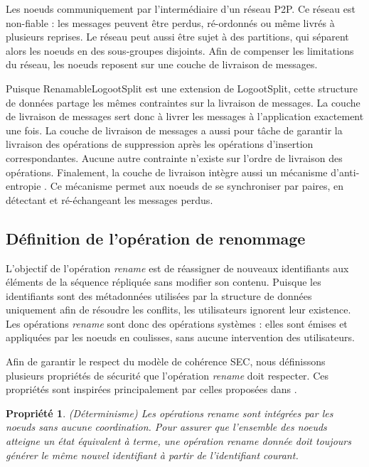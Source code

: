 \documentclass[12pt]{thesul}
\newtheorem{property}{Propriété}
\begin{document}
Les noeuds communiquement par l'intermédiaire d'un réseau \ac{P2P}.
Ce réseau est non-fiable : les messages peuvent être perdus, ré-ordonnés ou même livrés à plusieurs reprises.
Le réseau peut aussi être sujet à des partitions, qui séparent alors les noeuds en des sous-groupes disjoints.
Afin de compenser les limitations du réseau, les noeuds reposent sur une couche de livraison de messages.

Puisque RenamableLogootSplit est une extension de LogootSplit, cette structure de données partage les mêmes contraintes sur la livraison de messages.
La couche de livraison de messages sert donc à livrer les messages à l'application exactement une fois.
La couche de livraison de messages a aussi pour tâche de garantir la livraison des opérations de suppression après les opérations d'insertion correspondantes.
Aucune autre contrainte n'existe sur l'ordre de livraison des opérations.
Finalement, la couche de livraison intègre aussi un mécanisme d'anti-entropie \cite{1983-anti-entropy-vv}.
Ce mécanisme permet aux noeuds de se synchroniser par paires, en détectant et ré-échangeant les messages perdus.

\subsection{Définition de l'opération de renommage}

\label{sec:def-rename-op}

L'objectif de l'opération \emph{rename} est de réassigner de nouveaux identifiants aux éléments de la séquence répliquée sans modifier son contenu.
Puisque les identifiants sont des métadonnées utilisées par la structure de données uniquement afin de résoudre les conflits, les utilisateurs ignorent leur existence.
Les opérations \emph{rename} sont donc des opérations systèmes : elles sont émises et appliquées par les noeuds en coulisses, sans aucune intervention des utilisateurs.

Afin de garantir le respect du modèle de cohérence \ac{SEC}, nous définissons plusieurs propriétés de sécurité que l'opération \emph{rename} doit respecter.
Ces propriétés sont inspirées principalement par celles proposées dans \cite{zawirski:hal-01248197}.

\begin{property}(Déterminisme)
  Les opérations \emph{rename} sont intégrées par les noeuds sans aucune coordination.
  Pour assurer que l'ensemble des noeuds atteigne un état équivalent à terme, une opération \emph{rename} donnée doit toujours générer le même nouvel identifiant à partir de l'identifiant courant.
\end{property}
\end{document}
